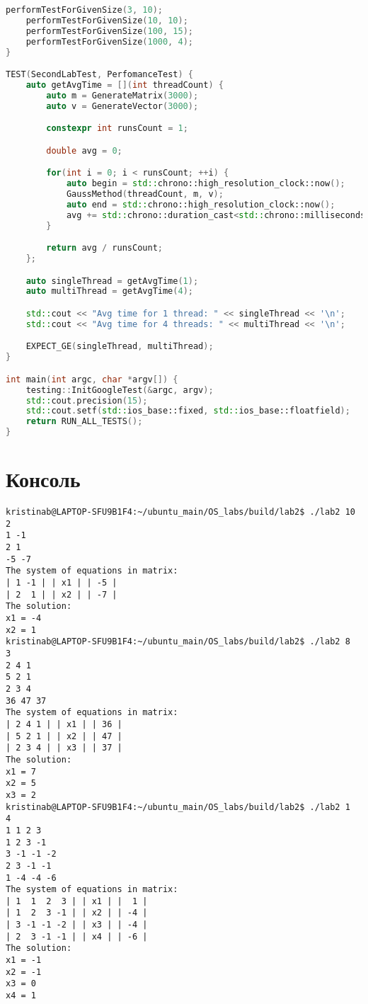 \documentclass[a4paper, 12pt]{article}
\begin{document}
\begin{lstlisting}[language=C++]
    performTestForGivenSize(3, 10);
    performTestForGivenSize(10, 10);
    performTestForGivenSize(100, 15);
    performTestForGivenSize(1000, 4);
}

TEST(SecondLabTest, PerfomanceTest) {
    auto getAvgTime = [](int threadCount) {
        auto m = GenerateMatrix(3000);
        auto v = GenerateVector(3000);

        constexpr int runsCount = 1;

        double avg = 0;

        for(int i = 0; i < runsCount; ++i) {
            auto begin = std::chrono::high_resolution_clock::now();
            GaussMethod(threadCount, m, v);
            auto end = std::chrono::high_resolution_clock::now();
            avg += std::chrono::duration_cast<std::chrono::milliseconds>(end - begin).count();
        }

        return avg / runsCount;
    };

    auto singleThread = getAvgTime(1);
    auto multiThread = getAvgTime(4);

    std::cout << "Avg time for 1 thread: " << singleThread << '\n';
    std::cout << "Avg time for 4 threads: " << multiThread << '\n';

    EXPECT_GE(singleThread, multiThread);
}

int main(int argc, char *argv[]) {
    testing::InitGoogleTest(&argc, argv);
    std::cout.precision(15);
    std::cout.setf(std::ios_base::fixed, std::ios_base::floatfield);
    return RUN_ALL_TESTS();
}
\end{lstlisting}

\newpage
\section{Консоль}
\begin{verbatim}
kristinab@LAPTOP-SFU9B1F4:~/ubuntu_main/OS_labs/build/lab2$ ./lab2 10
2
1 -1
2 1
-5 -7
The system of equations in matrix:
| 1 -1 | | x1 | | -5 |
| 2  1 | | x2 | | -7 |
The solution:
x1 = -4
x2 = 1
kristinab@LAPTOP-SFU9B1F4:~/ubuntu_main/OS_labs/build/lab2$ ./lab2 8
3
2 4 1
5 2 1
2 3 4
36 47 37
The system of equations in matrix:
| 2 4 1 | | x1 | | 36 |
| 5 2 1 | | x2 | | 47 |
| 2 3 4 | | x3 | | 37 |
The solution:
x1 = 7
x2 = 5
x3 = 2
kristinab@LAPTOP-SFU9B1F4:~/ubuntu_main/OS_labs/build/lab2$ ./lab2 1
4
1 1 2 3
1 2 3 -1
3 -1 -1 -2
2 3 -1 -1
1 -4 -4 -6
The system of equations in matrix:
| 1  1  2  3 | | x1 | |  1 |
| 1  2  3 -1 | | x2 | | -4 |
| 3 -1 -1 -2 | | x3 | | -4 |
| 2  3 -1 -1 | | x4 | | -6 |
The solution:
x1 = -1
x2 = -1
x3 = 0
x4 = 1
\end{verbatim}
\newpage
\end{document}
